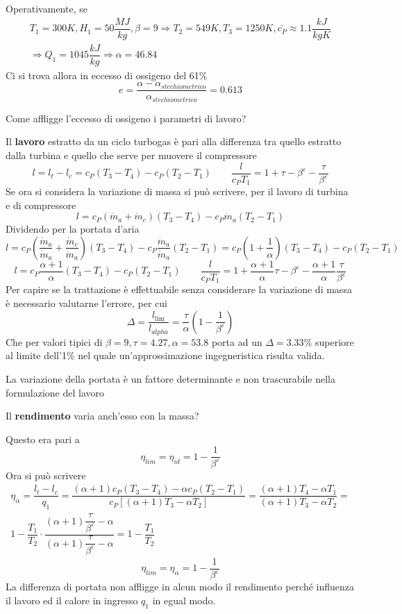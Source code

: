 \begin{adjustwidth}{2in}{}
	Operativamente, se 
	\[\begin{split}
		T_1 = 300K, H_1 = 50 \dfrac{MJ}{kg}, \beta=9 \Rightarrow T_2 = 549K, T_3 = 1250 K, \bar{c_P} \approx 1.1 \dfrac{kJ}{kgK} \\ \Rightarrow Q_1 = 1045 \dfrac{kJ}{kg} \Rightarrow \alpha = 46.84
	\end{split}\]
	Ci si trova allora in eccesso di ossigeno del 61\%
	\[e = \dfrac{\alpha - \alpha_{stechiometrico}}{\alpha_{stechiometrico}} = 0.613\]
	
	Come affligge l'eccesso di ossigeno i parametri di lavoro? 
	
	Il \textbf{lavoro} estratto da un ciclo turbogas è pari alla differenza tra quello estratto dalla turbina e quello che serve per muovere il compressore 
	\[l = l_t-l_c = c_P(T_3-T_4)-c_P(T_2-T_1) \qquad \dfrac{l}{c_PT_1} = 1 + \tau - \beta^\varepsilon - \dfrac{\tau}{\beta^\varepsilon}\]
	Se ora si considera la variazione di massa si può scrivere, per il lavoro di turbina e di compressore
	\[l = c_P(\dot{m}_a + \dot{m}_c)(T_3-T_4) - c_P\dot{m}_a(T_2-T_1)\]
	Dividendo per la portata d'aria
	\[l = c_P\left(\dfrac{\dot{m}_a}{\dot{m}_a} + \dfrac{\dot{m}_c}{\dot{m}_a}\right)(T_3-T_4) - c_P\dfrac{\dot{m}_a}{\dot{m}_a}(T_2-T_1) = c_P\left(1 + \dfrac{1}{\alpha}\right)(T_3-T_4) - c_P(T_2-T_1) \]
	\[l = c_P\dfrac{\alpha+1}{\alpha}(T_3-T_4) - c_P(T_2-T_1) \qquad  \dfrac{l}{c_PT_1} = 1 + \dfrac{\alpha+1}{\alpha}\tau - \beta^\varepsilon - \dfrac{\alpha+1}{\alpha}\dfrac{\tau}{\beta^\varepsilon}\]
	Per capire se la trattazione è effettuabile senza considerare la variazione di massa è necessario valutarne l'errore, per cui
	\[\Delta = \dfrac{l_\text{lim}}{l_{alpha}} = \dfrac{\tau}{\alpha}\left(1-\dfrac{1}{\beta^\varepsilon}\right)\]
	Che per valori tipici di $\beta = 9, \tau = 4.27, \alpha = 53.8$ porta ad un $\Delta = 3.33 \%$ superiore al limite dell'1\% nel quale un'approssimazione ingegneristica risulta valida. \newline 
	
	La variazione della portata è un fattore determinante e non trascurabile nella formulazione del lavoro \newline 
	
	Il \textbf{rendimento} varia anch'esso con la massa? 
	
	Questo era pari a 
	\[\eta_{lim} = \eta_{id} = 1 - \dfrac{1}{\beta^\varepsilon}\]
	Ora si può scrivere 
	\[
	\begin{split}
		\eta_\alpha = \dfrac{l_t-l_c}{q_1} = \dfrac{(\alpha+1)c_P(T_3-T_4)-\alpha c_P(T_2-T_1)}{c_P\left[(\alpha+1)T_3 - \alpha T_2\right]} = \dfrac{(\alpha+1)T_4-\alpha T_1}{(\alpha+1)T_3-\alpha T_2} = \\ 1-\dfrac{T_1}{T_2}\cdot\dfrac{(\alpha+1)\dfrac{\tau}{\beta^\varepsilon}-\alpha}{(\alpha+1)\dfrac{\tau}{\beta^\varepsilon}-\alpha} = 1-\dfrac{T_1}{T_2}
	\end{split}
	\]
	\[\eta_{lim} = \eta_\alpha = 1 - \dfrac{1}{\beta^\varepsilon}\]
	La differenza di portata non affligge in alcun modo il rendimento perché influenza il lavoro ed il calore in ingresso $q_1$ in egual modo. 		
\end{adjustwidth}

